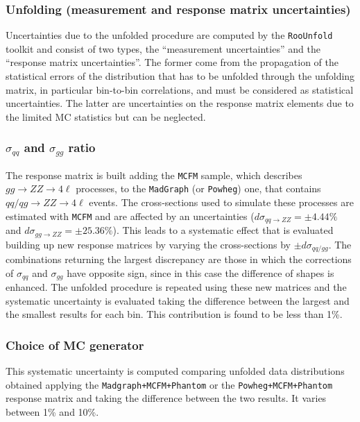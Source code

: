 \subsubsection{Unfolding (measurement and response matrix uncertainties)}
Uncertainties due to the unfolded procedure are computed by the \texttt{RooUnfold} toolkit and consist of two types, the 
``measurement uncertainties'' and the ``response matrix uncertainties''. The former come from the propagation of the statistical 
errors of the distribution that has to be unfolded through the unfolding matrix, in particular bin-to-bin correlations, and must be considered 
as statistical uncertainties. The latter are uncertainties on the response matrix elements due to the limited MC statistics but can be neglected.%

\subsubsection{$\sigma_{qq}$ and $\sigma_{gg}$ ratio}
The response matrix is built adding the \texttt{MCFM} sample, which describes $gg\to ZZ\to 4\ell$ processes, to  the \texttt{MadGraph} (or \texttt{Powheg})
one, that contains $qq/qg\to ZZ \to 4\ell$ events. The cross-sections used to simulate these processes are estimated with \texttt{MCFM} and are affected
by an uncertainties ($d\sigma_{qq\to ZZ}= \pm 4.44\%$ and $d\sigma_{gg\to ZZ}= \pm 25.36\%$). This leads to a systematic effect that is evaluated building 
up new response matrices by varying the cross-sections by $\pm d\sigma_{qq/gg}$. The combinations returning the largest discrepancy are those in which 
the corrections of $\sigma_{qq}$ and $\sigma_{gg}$ have opposite sign, since in this case the difference of shapes is enhanced. The unfolded procedure 
is repeated using these new matrices and the systematic uncertainty is evaluated taking the difference between the largest and the smallest results 
for each bin. This contribution is found to be less than 1\%. 
\subsubsection{Choice of MC generator}
This systematic uncertainty is computed comparing unfolded data distributions obtained applying the \texttt{Madgraph+MCFM+Phantom} or the \texttt{Powheg+MCFM+Phantom}
response matrix and taking the difference between the two results. It varies between 1\% and 10\%.

